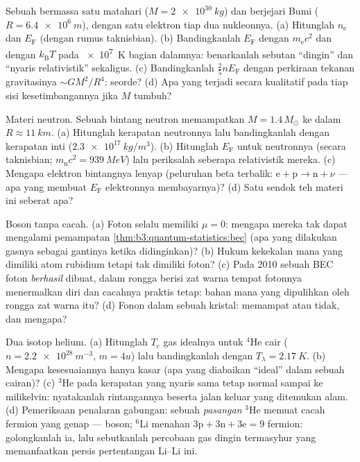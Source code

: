 \begin{exercise}[$\star\star$]\label{exo:b3:quantum-statistics:6}
Sebuah  bermassa satu matahari ($M = \qty{2e30}{kg}$) dan
berjejari Bumi ($R = \qty{6.4e6}{m}$), dengan satu elektron tiap dua
nukleonnya. (a) Hitunglah $n_{\text{e}}$ dan $E_{\text{F}}$ (dengan
rumus taknisbian). (b) Bandingkanlah $E_{\text{F}}$ dengan $m_{\text{e}}c^2$ dan
dengan $k_{\text{B}}T$ pada \qty{e7}{K} bagian dalamnya: benarkanlah
sebutan ``dingin'' dan ``nyaris relativistik'' sekaligus. (c)
Bandingkanlah  $\tfrac25 nE_{\text{F}}$ dengan
perkiraan tekanan gravitasinya $\sim GM^2/R^4$: seorde? (d) Apa yang
terjadi secara kualitatif pada tiap sisi kesetimbangannya jika $M$ tumbuh?
\end{exercise}

\begin{exercise}[$\star\star$]\label{exo:b3:quantum-statistics:7}
Materi neutron. Sebuah bintang neutron memampatkan $M = 1.4\,M_\odot$ ke dalam $R
\approx \qty{11}{km}$. (a) Hitunglah kerapatan neutronnya lalu
bandingkanlah dengan kerapatan inti ($\qty{2.3e17}{kg/m^3}$). (b)
Hitunglah $E_{\text{F}}$ untuk neutronnya (secara taknisbian; $m_{\text{n}}c^2
= \qty{939}{MeV}$) lalu periksalah seberapa relativistik mereka. (c)
Mengapa elektron bintangnya lenyap (peluruhan beta terbalik:
$\text{e} + \text{p} \to \text{n} + \nu$ --- apa yang membuat
$E_{\text{F}}$ elektronnya membayarnya)? (d) Satu sendok teh materi ini
seberat apa?
\end{exercise}

\begin{exercise}[$\star\star$]\label{exo:b3:quantum-statistics:8}
Boson tanpa cacah. (a) Foton selalu memiliki $\mu = 0$: mengapa mereka
tak dapat mengalami pemampatan
\cref{thm:b3:quantum-statistics:bec} (apa yang dilakukan gasnya sebagai
gantinya ketika didinginkan)? (b) Hukum kekekalan mana yang dimiliki
atom rubidium tetapi tak dimiliki foton? (c) Pada 2010 sebuah BEC foton
\emph{berhasil} dibuat, dalam rongga berisi zat warna tempat fotonnya
menermalkan diri dan cacahnya praktis tetap: bahan mana yang dipulihkan
oleh rongga zat warna itu?
(d) Fonon dalam sebuah kristal: memampat atau tidak, dan mengapa?
\end{exercise}

\begin{exercise}[$\star\star$]\label{exo:b3:quantum-statistics:9}
Dua isotop helium. (a) Hitunglah $T_{\text{c}}$ gas idealnya
untuk $^4$He cair ($n = \qty{2.2e28}{m^{-3}}$, $m = 4u$) lalu
bandingkanlah dengan $T_\lambda = \qty{2.17}{K}$. (b) Mengapa
kesesuaiannya hanya kasar (apa yang diabaikan ``ideal'' dalam sebuah
cairan)? (c) $^3$He pada kerapatan yang nyaris sama tetap normal sampai
ke milikelvin: nyatakanlah rintangannya beserta jalan keluar yang
ditemukan alam. (d) Pemeriksaan penalaran gabungan: sebuah \emph{pasangan} $^3$He memuat cacah
fermion yang genap --- boson; $^6$Li menahan $3\text{p} + 3\text{n}
+ 3\text{e} = 9$ fermion: golongkanlah ia, lalu sebutkanlah percobaan
gas dingin termasyhur yang memanfaatkan persis pertentangan Li--Li ini.
\end{exercise}

